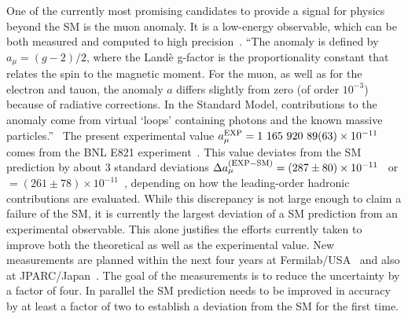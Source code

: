 One of the currently most promising candidates to provide a signal for physics beyond the SM
is the muon anomaly. It is a low-energy observable, which
can be both measured and computed to high precision~\cite{Jegerlehner:2009ry,Blum:2013xva}.
``The anomaly is defined by $a_\mu = (g-2)/2$, where the Land\`e g-factor is the proportionality constant that relates the spin to the magnetic moment.
 For the muon, as well as for the electron and tauon,
  the anomaly $a$ differs slightly from zero (of order $10^{-3}$)
  because of radiative corrections. In the Standard Model, contributions to the anomaly come from virtual `loops' containing photons and the known massive particles.''~\cite{miller} 
 The present experimental value $a_\mu^{\rm EXP}= 1\ 165\ 920\ 89 (63)\times 10^{-11}$
comes from the BNL E821 experiment~\cite{Bennett:2006fi}.  This value
deviates from the SM prediction by about 3 standard
deviations $\Delta a_\mu^{({\rm EXP-SM})}= (287\pm 80)\times 10^{-11}$~\cite{Davier:2010nc} 
or $= (261\pm 78)\times 10^{-11}$~\cite{Hagiwara:2011af}, depending on how the leading-order
hadronic contributions are evaluated.  While this discrepancy
is not large enough to claim a failure of the SM, it is currently the largest
deviation of a SM prediction from an experimental observable. This
alone justifies the efforts currently taken to improve both the theoretical as well as the experimental value.
New measurements are planned within the next four years at 
Fermilab/USA~\cite{Grange:2015fou} and also at JPARC/Japan~\cite{Saito:2012zz}. The goal
of the measurements is to reduce the uncertainty by a factor of four. 
In parallel the SM prediction needs to be improved in accuracy 
by at least a factor of two to establish a deviation from the SM for the first time.


